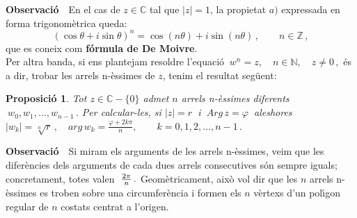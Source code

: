 \documentclass[12pt]{article}
\newcommand{\demostracio}{\textbf{Demostraci{\'o}}\ \ }
\newcommand{\observacio}{\textbf{Observaci{\'o}}\ \ }
\newtheorem{proposicio}{Proposici{\'o}}[subsection]
\newcommand{\Z}{\mathbb{Z}}
\newcommand{\C}{\mathbb{C}}
\begin{document}
\vspace{0.4cm}
\observacio En el cas de $z\in \C$ tal que $|z|=1$, la propietat
$a)$ expressada en forma trigonom{\`e}trica queda:
$$(\cos\theta+i\sin\theta)^n=\cos{(n\theta)}+i\sin{(n\theta)}\,,\qquad n\in \mathbb{Z}\,,$$
que es coneix com \textbf{f{\'o}rmula de De Moivre}.\\

Per altra banda, si ens plantejam resoldre l'equaci{\'o} $\
w^n=z,\quad n\in \mathbb{N},\quad z\neq 0\,,$ \'{e}s a dir, trobar
les arrels n-{\`e}ssimes de $z$, tenim el  resultat seg{\"u}ent:

\begin{proposicio}
Tot $z\in \C-\{0\}$ admet $n$ arrels n-{\`e}ssimes diferents $\
w_0,w_1,...,w_{n-1}\,.$ Per calcular-les, si $|z|=r\ $ i $\ Arg\,
z=\varphi\ $ aleshores\\

\hspace{2.5cm} $|w_k|=\sqrt[n]{r}\,,\quad arg\,
 w_k=\displaystyle\frac{\varphi+2k\pi}{n},\qquad k=0,1,2,...,n-1\,.$
\end{proposicio}

%
%
%
%
%
%
%
%

\vspace{0.4cm}
\observacio Si  miram els arguments de les  arrels n-{\`e}ssimes, veim que les difer{\`e}ncies dels arguments de
cada dues arrels consecutives s{\'o}n sempre iguals; concretament, totes valen
$\ {2\pi\over n}\,.$ Geom{\`e}tricament, aix{\`o} vol dir que les $n$ arrels n-{\`e}ssimes es troben sobre una
circumfer{\`e}ncia i formen els $n$ v{\`e}rtexs d'un pol{\'\i}gon regular de $n$ costats centrat a l'origen.\\
\end{document}
